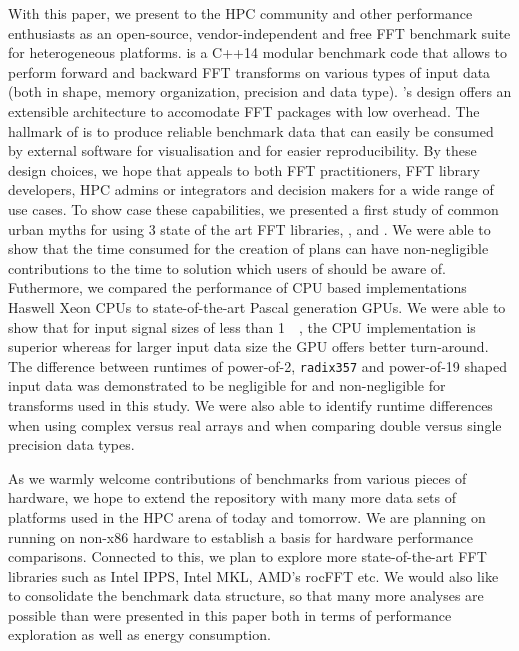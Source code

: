 
With this paper, we present \gearshifft{} to the HPC community and other performance enthusiasts as an open-source, vendor-independent and free FFT benchmark suite for heterogeneous platforms. \gearshifft{} is a C++14 modular benchmark code that allows to perform forward and backward FFT transforms on various types of input data (both in shape, memory organization, precision and data type). \gearshifft{}'s design offers an extensible architecture to accomodate FFT packages with low overhead. The hallmark of \gearshifft{} is to produce reliable benchmark data that can easily be consumed by external software for visualisation and for easier reproducibility. By these design choices, we hope that \gearshifft{} appeals to both FFT practitioners, FFT library developers, HPC admins or integrators and decision makers for a wide range of use cases. To show case these capabilities, we presented a first study of common urban myths for using 3 state of the art FFT libraries, \fftw{}, \clfft{} and \cufft{}. We were able to show that the time consumed for the creation of \fftw{} plans can have non-negligible contributions to the time to solution which users of \fftw{} should be aware of. Futhermore, we compared the performance of CPU based implementations Haswell Xeon CPUs to state-of-the-art Pascal generation \nvidia{} GPUs. We were able to show that for input signal sizes of less than \SI{1}{\mebi\byte}, the CPU implementation is superior whereas for larger input data size the GPU offers better turn-around. The difference between runtimes of power-of-2, {\tt radix357} and power-of-19 shaped input data was demonstrated to be negligible for \fftw{} and non-negligible for \cufft{} transforms used in this study. We were also able to identify runtime differences when using complex versus real arrays and when comparing double versus single precision data types.     

As we warmly welcome contributions of benchmarks from various pieces of hardware, we hope to extend the \gearshifft{} repository with many more data sets of platforms used in the HPC arena of today and tomorrow. We are planning on running \gearshifft{} on non-x86 hardware to establish a basis for hardware performance comparisons. Connected to this, we plan to explore more state-of-the-art FFT libraries such as Intel IPPS, Intel MKL, AMD's rocFFT etc. We would also like to consolidate the benchmark data structure, so that many more analyses are possible than were presented in this paper both in terms of performance exploration as well as energy consumption.  

